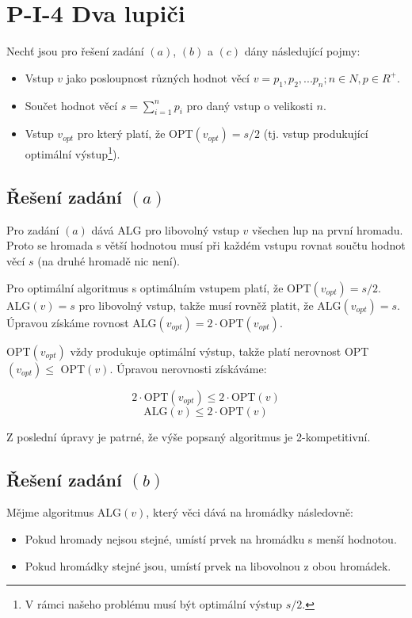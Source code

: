 \documentclass[a4paper, 12pt]{article}
\begin{document}
  \section{P-I-4 Dva lupiči}
  Nechť jsou pro řešení zadání $(a)$, $(b)$ a $(c)$ dány následující pojmy:
  \begin{itemize}[noitemsep]
    \item Vstup $v$ jako posloupnost různých hodnot věcí $v=p_1, p_2,...p_n;n \in N, p \in R^+$.
    \item Součet hodnot věcí $s=\sum\limits_{i=1}^n p_i$ pro daný vstup o velikosti $n$.
    \item Vstup $v_{opt}$ pro který platí, že OPT$(v_{opt})=s/2$ (tj. vstup produkující optimální výstup\footnote{V rámci našeho problému musí být optimální výstup $s/2$.}).
  \end{itemize}

  \subsection{Řešení zadání $(a)$}
  Pro zadání $(a)$ dává ALG pro libovolný vstup $v$ všechen lup na první hromadu. Proto se hromada s větší hodnotou musí při každém vstupu rovnat součtu hodnot věcí $s$ (na druhé hromadě nic není).

  Pro optimální algoritmus s optimálním vstupem platí, že OPT$(v_{opt})=s/2$.
  ALG$(v)=s$ pro libovolný vstup, takže musí rovněž platit, že ALG$(v_{opt})=s$. Úpravou získáme rovnost ALG$(v_{opt}) = 2 \cdot$OPT$(v_{opt})$.

  OPT$(v_{opt})$ vždy produkuje optimální výstup, takže platí nerovnost OPT$(v_{opt}) \le$ OPT$(v)$. Úpravou nerovnosti získáváme:

  $$2 \cdot\text{OPT}(v_{opt}) \le 2\cdot\text{OPT}(v)$$
  $$\text{ALG}(v) \le 2 \cdot\text{OPT}(v)$$

  Z poslední úpravy je patrné, že výše popsaný algoritmus je 2-kompetitivní.

  \subsection{Řešení zadání $(b)$}
  Mějme algoritmus ALG$(v)$, který věci dává na hromádky následovně:
  \begin{itemize}[noitemsep, topsep=0pt]
    \item Pokud hromady nejsou stejné, umístí prvek na hromádku s menší hodnotou.
    \item Pokud hromádky stejné jsou, umístí prvek na libovolnou z obou hromádek.
  \end{itemize}
\end{document}
